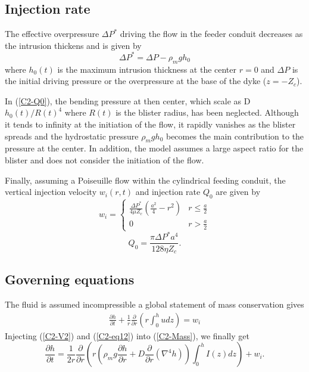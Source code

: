 \subsection{Injection rate}

The effective overpressure $\Delta P^*$ driving the flow in the feeder
conduit decreases as the intrusion thickens and is given by
\begin{equation}
  \Delta P^* = \Delta P -\rho_m g h_0 \label{C2-Q0}
\end{equation}
where $h_0(t)$ is the maximum  intrusion thickness at the center $r=0$
and $\Delta P$ is the initial  driving pressure or the overpressure at
the base of the dyke ($z = -Z_c$).

In (\ref{C2-Q0}), the bending pressure  at then center, which scale as
D$h_0(t)/R(t)^4$  where  $R(t)$  is   the  blister  radius,  has  been
neglected.  Although  it tends  to infinity at  the initiation  of the
flow, it rapidly  vanishes as the blister spreads  and the hydrostatic
pressure $\rho_m g h_0$ becomes  the main contribution to the pressure
at the  center.  In addition, the  model assumes a large  aspect ratio
for the blister and does not consider the initiation of the flow.

Finally,  assuming a  Poiseuille flow  within the  cylindrical feeding
conduit, the vertical injection velocity $w_i(r,t)$ and injection rate
$Q_0$ are given by
\begin{equation}
  w_i=
  \begin{cases}
    \frac{ \Delta P^*}{4 \mu Z_{c}} (\frac{a^{2}}{4}-r^{2})& r \le \frac{a}{2}\\
    0 & r > \frac{a}{2}
  \end{cases}
  \label{C2-eq12}
\end{equation}
\begin{equation}
  Q_{0}=\frac{\pi \Delta P^* a^{4}}{128 \eta Z_c}.
  \label{C2-eq11}
\end{equation}


\subsection{Governing equations}
\label{chap2-sec:governing-equations}

The  fluid  is  assumed  incompressible a  global  statement  of  mass
conservation gives
\begin{eqnarray}
  \frac{\partial         h}{\partial        t} +\frac{1}{r}
  \frac{\partial}{\partial
  r} \left( r\int_0^hudz\right) = w_i
  \label{C2-Mass}
\end{eqnarray}
Injecting (\ref{C2-V2})  and (\ref{C2-eq12}) into  (\ref{C2-Mass}), we
finally get
\begin{equation}
  \frac{\partial h}{\partial t} = \frac{1}{2r}
  \frac{\partial}{\partial r} \left( r\left(\rho_m g \frac{\partial h}{\partial      r}+D\frac{\partial}{\partial      r}\left(\nabla^4h\right)\right)\int_0^hI(z)dz\right)
  + w_i.
  \label{C2-EqConservation}
\end{equation}

